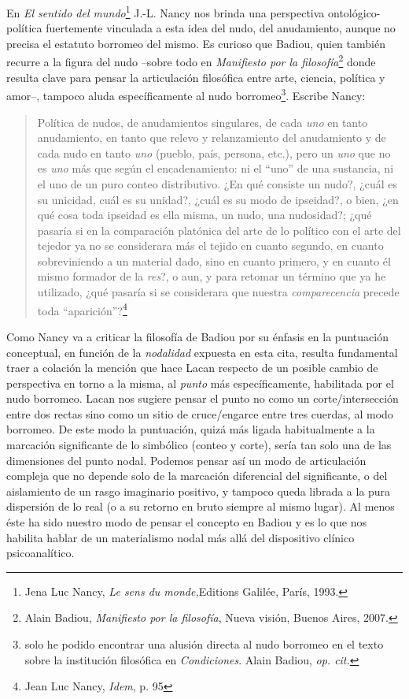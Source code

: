 \documentclass{book}
\begin{document}
En \emph{El sentido del mundo}\footnote{Jena Luc Nancy, \emph{Le sens du
  monde,}Editions Galilée, París, 1993.} J.-L. Nancy nos brinda una
perspectiva ontológico-política fuertemente vinculada a esta idea del
nudo, del anudamiento, aunque no precisa el estatuto borromeo del mismo.
Es curioso que Badiou, quien también recurre a la figura del nudo
--sobre todo en \emph{Manifiesto por la filosofía}\footnote{Alain
  Badiou, \emph{Manifiesto por la filosofía}, Nueva visión, Buenos
  Aires, 2007.} donde resulta clave para pensar la articulación
filosófica entre arte, ciencia, política y amor--, tampoco aluda
específicamente al nudo borromeo\footnote{solo he podido encontrar una
  alusión directa al nudo borromeo en el texto sobre la institución
  filosófica en \emph{Condiciones}. Alain Badiou, \emph{op. cit.}}.
Escribe Nancy:

\begin{quote}
Política de nudos, de anudamientos singulares, de cada \emph{uno} en
tanto anudamiento, en tanto que relevo y relanzamiento del anudamiento y
de cada nudo en tanto \emph{uno} (pueblo, país, persona, etc.), pero un
\emph{uno} que no es \emph{uno} más que según el encadenamiento: ni el
``uno'' de una sustancia, ni el uno de un puro conteo distributivo. ¿En
qué consiste un nudo?, ¿cuál es su unicidad, cuál es su unidad?, ¿cuál
es su modo de ipseidad?, o bien, ¿en qué cosa toda ipseidad es ella
misma, un nudo, una nudosidad?; ¿qué pasaría si en la comparación
platónica del arte de lo político con el arte del tejedor ya no se
considerara más el tejido en cuanto segundo, en cuanto sobreviniendo a
un material dado, sino en cuanto primero, y en cuanto él mismo formador
de la \emph{res}?, o aun, y para retomar un término que ya he utilizado,
¿qué pasaría si se considerara que nuestra \emph{comparecencia} precede
toda ``aparición''?\footnote{Jean Luc Nancy, \emph{Idem}, p. 95}
\end{quote}

Como Nancy va a criticar la filosofía de Badiou por su énfasis en la
puntuación conceptual, en función de la \emph{nodalidad} expuesta en
esta cita, resulta fundamental traer a colación la mención que hace
Lacan respecto de un posible cambio de perspectiva en torno a la misma,
al \emph{punto} más específicamente, habilitada por el nudo borromeo.
Lacan nos sugiere pensar el punto no como un corte/intersección entre
dos rectas sino como un sitio de cruce/engarce entre tres cuerdas, al
modo borromeo. De este modo la puntuación, quizá más ligada
habitualmente a la marcación significante de lo simbólico (conteo y
corte), sería tan solo una de las dimensiones del punto nodal. Podemos
pensar así un modo de articulación compleja que no depende solo de la
marcación diferencial del significante, o del aislamiento de un rasgo
imaginario positivo, y tampoco queda librada a la pura dispersión de lo
real (o a su retorno en bruto siempre al mismo lugar). Al menos éste ha
sido nuestro modo de pensar el concepto en Badiou y es lo que nos
habilita hablar de un materialismo nodal más allá del dispositivo
clínico psicoanalítico.
\end{document}
